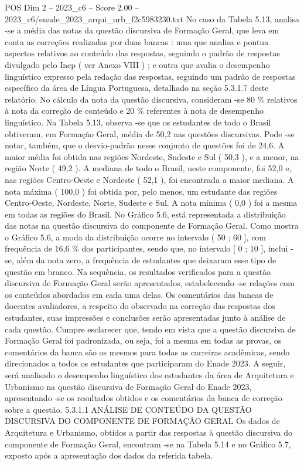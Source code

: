 \begin{textsample}{POS Dim 2 – 2023\_c6 – Score 2.00 – 2023\_c6/enade\_2023\_arqui\_urb\_f2c5983230.txt}
No caso da Tabela 5.13, analisa -se a média das notas da questão discursiva de Formação Geral, que leva em conta as correções realizadas por duas bancas : uma que analisa e pontua aspectos relativos ao conteúdo das respostas, seguindo o padrão de respostas divulgado pelo Inep ( ver Anexo VIII ) ; e outra que avalia o desempenho linguístico expresso pela redação das respostas, seguindo um padrão de respostas específico da área de Língua Portuguesa, detalhado na seção 5.3.1.7 deste relatório.
No cálculo da nota da questão discursiva, consideram -se 80 \% relativos à nota da correção de conteúdo e 20 \% referentes à nota de desempenho linguístico.
Na Tabela 5.13, observa -se que os estudantes de todo o Brasil obtiveram, em Formação Geral, média de 50,2 nas questões discursivas.
Pode -se notar, também, que o desvio-padrão nesse conjunto de questões foi de 24,6.
A maior média foi obtida nas regiões Nordeste, Sudeste e Sul ( 50,3 ), e a menor, na região Norte ( 49,2 ).
A mediana de todo o Brasil, neste componente, foi 52,0 e, nas regiões Centro-Oeste e Nordeste ( 52,1 ), foi encontrada a maior mediana.
A nota máxima ( 100,0 ) foi obtida por, pelo menos, um estudante das regiões Centro-Oeste, Nordeste, Norte, Sudeste e Sul.
A nota mínima ( 0,0 ) foi a mesma em todas as regiões do Brasil.
No Gráfico 5.6, está representada a distribuição das notas na questão discursiva do componente de Formação Geral.
Como mostra o Gráfico 5.6, a moda da distribuição ocorre no intervalo ( 50 ; 60 ], com frequência de 16,6 \% dos participantes, sendo que, no intervalo [ 0 ; 10 ], inclui -se, além da nota zero, a frequência de estudantes que deixaram esse tipo de questão em branco.
Na sequência, os resultados verificados para a questão discursiva de Formação Geral serão apresentados, estabelecendo -se relações com os conteúdos abordados em cada uma delas.
Os comentários das bancas de docentes avaliadores, a respeito do observado na correção das respostas dos estudantes, suas impressões e conclusões serão apresentadas junto à análise de cada questão.
Cumpre esclarecer que, tendo em vista que a questão discursiva de Formação Geral foi padronizada, ou seja, foi a mesma em todas as provas, os comentários da banca são os mesmos para todas as carreiras acadêmicas, sendo direcionados a todos os estudantes que participaram do Enade 2023.
A seguir, será analisado o desempenho linguístico dos estudantes da área de Arquitetura e Urbanismo na questão discursiva de Formação Geral do Enade 2023, apresentando -se os resultados obtidos e os comentários da banca de correção sobre a questão. 5.3.1.1 ANÁLISE DE CONTEÚDO DA QUESTÃO DISCURSIVA DO COMPONENTE DE FORMAÇÃO GERAL Os dados de Arquitetura e Urbanismo, obtidos a partir das respostas à questão discursiva do componente de Formação Geral, encontram -se na Tabela 5.14 e no Gráfico 5.7, exposto após a apresentação dos dados da referida tabela.

\end{textsample}
